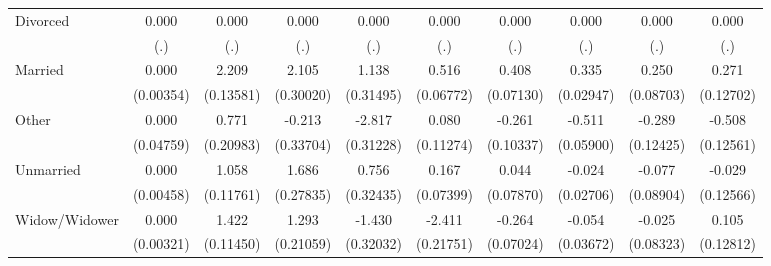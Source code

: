 {\begin{tabular}{l*{9}{c}}
Divorced            &       0.000         &       0.000         &       0.000         &       0.000         &       0.000         &       0.000         &       0.000         &       0.000         &       0.000         \\
                    &         (.)         &         (.)         &         (.)         &         (.)         &         (.)         &         (.)         &         (.)         &         (.)         &         (.)         \\
Married             &       0.000         &       2.209\sym{***}&       2.105\sym{***}&       1.138\sym{***}&       0.516\sym{***}&       0.408\sym{***}&       0.335\sym{***}&       0.250\sym{**} &       0.271\sym{*}  \\
                    &   (0.00354)         &   (0.13581)         &   (0.30020)         &   (0.31495)         &   (0.06772)         &   (0.07130)         &   (0.02947)         &   (0.08703)         &   (0.12702)         \\
Other               &       0.000         &       0.771\sym{***}&      -0.213         &      -2.817\sym{***}&       0.080         &      -0.261\sym{*}  &      -0.511\sym{***}&      -0.289\sym{*}  &      -0.508\sym{***}\\
                    &   (0.04759)         &   (0.20983)         &   (0.33704)         &   (0.31228)         &   (0.11274)         &   (0.10337)         &   (0.05900)         &   (0.12425)         &   (0.12561)         \\
Unmarried           &       0.000         &       1.058\sym{***}&       1.686\sym{***}&       0.756\sym{*}  &       0.167\sym{*}  &       0.044         &      -0.024         &      -0.077         &      -0.029         \\
                    &   (0.00458)         &   (0.11761)         &   (0.27835)         &   (0.32435)         &   (0.07399)         &   (0.07870)         &   (0.02706)         &   (0.08904)         &   (0.12566)         \\
Widow/Widower       &       0.000         &       1.422\sym{***}&       1.293\sym{***}&      -1.430\sym{***}&      -2.411\sym{***}&      -0.264\sym{***}&      -0.054         &      -0.025         &       0.105         \\
                    &   (0.00321)         &   (0.11450)         &   (0.21059)         &   (0.32032)         &   (0.21751)         &   (0.07024)         &   (0.03672)         &   (0.08323)         &   (0.12812)         \\

\end{tabular}}
